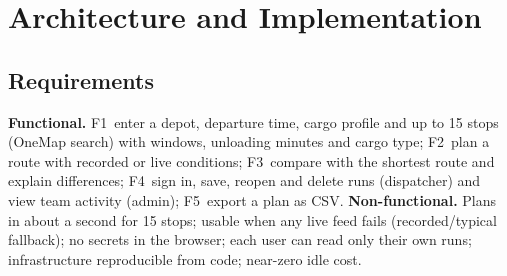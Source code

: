 \documentclass[10.5pt,a4paper]{article}
\begin{document}
\section{Architecture and Implementation}
\subsection{Requirements}
\textbf{Functional.} F1~enter a depot, departure time, cargo profile and up to 15 stops (OneMap search) with windows, unloading
minutes and cargo type; F2~plan a route with recorded or live conditions; F3~compare with the shortest route and explain
differences; F4~sign in, save, reopen and delete runs (dispatcher) and view team activity (admin); F5~export a plan as CSV.
\textbf{Non-functional.} Plans in about a second for 15 stops; usable when any live feed fails (recorded/typical fallback);
no secrets in the browser; each user can read only their own runs; infrastructure reproducible from code; near-zero idle cost.
\end{document}

